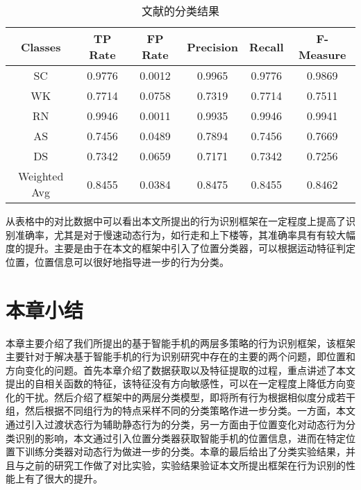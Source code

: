   \begin{table}[htb]
    \centering
    \caption{文献的分类结果}
    \begin{tabular}{cccccc}
    \toprule
    Classes & TP Rate & FP Rate & Precision & Recall & F-Measure \\
    \midrule
    SC & 0.9776 & 0.0012 & 0.9965 & 0.9776 & 0.9869 \\
    WK & 0.7714 & 0.0758 & 0.7319 & 0.7714 & 0.7511 \\
    RN & 0.9946 & 0.0011 & 0.9935 & 0.9946 & 0.9941 \\
    AS & 0.7456 & 0.0489 & 0.7894 & 0.7456 & 0.7669 \\
    DS & 0.7342 & 0.0659 & 0.7171 & 0.7342 & 0.7256 \\
    
    Weighted Avg & 0.8455 & 0.0384 & 0.8475 & 0.8455 & 0.8462 \\
    \bottomrule
    \end{tabular}
 \end{table}
\par 从表格中的对比数据中可以看出本文所提出的行为识别框架在一定程度上提高了识别准确率，尤其是对于慢速动态行为，如行走和上下楼等，其准确率具有有较大幅度的提升。主要是由于在本文的框架中引入了位置分类器，可以根据运动特征判定位置，位置信息可以很好地指导进一步的行为分类。
 \section{本章小结}
 \par 本章主要介绍了我们所提出的基于智能手机的两层多策略的行为识别框架，该框架主要针对于解决基于智能手机的行为识别研究中存在的主要的两个问题，即位置和方向变化的问题。首先本章介绍了数据获取以及特征提取的过程，重点讲述了本文提出的自相关函数的特征，该特征没有方向敏感性，可以在一定程度上降低方向变化的干扰。然后介绍了框架中的两层分类模型，即将所有行为根据相似度分成若干组，然后根据不同组行为的特点采样不同的分类策略作进一步分类。一方面，本文通过引入过渡状态行为辅助静态行为的分类，另一方面由于位置变化对动态行为分类识别的影响，本文通过引入位置分类器获取智能手机的位置信息，进而在特定位置下训练分类器对动态行为做进一步的分类。本章的最后给出了分类实验结果，并且与之前的研究工作做了对比实验，实验结果验证本文所提出框架在行为识别的性能上有了很大的提升。

